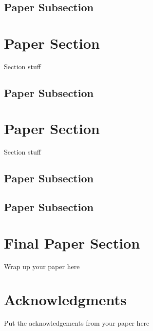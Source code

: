 {\subsection{Paper Subsection}
\section{Paper Section}
Section stuff

\subsection{Paper Subsection}
\section{Paper Section}
Section stuff

\subsection{Paper Subsection}

\subsection{Paper Subsection}
\section{Final Paper Section}
Wrap up your paper here






\section*{Acknowledgments}
Put the acknowledgements from your paper here

}